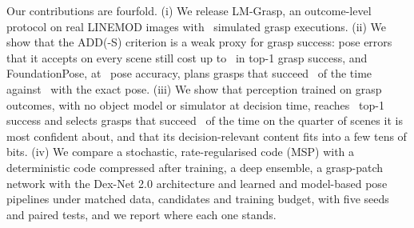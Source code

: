 Our contributions are fourfold. (i) We release LM-Grasp, an outcome-level protocol on real LINEMOD images with \NRollouts\ simulated grasp executions. (ii) We show that the ADD(-S) criterion is a weak proxy for grasp success: pose errors that it accepts on every scene still cost up to \NoiseSatDrop\ in top-1 grasp success, and FoundationPose, at \FpAdd\ pose accuracy, plans grasps that succeed \FpPlanTop\ of the time against \GtPlanTop\ with the exact pose. (iii) We show that perception trained on grasp outcomes, with no object model or simulator at decision time, reaches \EnsTopMean\ top-1 success and selects grasps that succeed \EnsSelQMean\ of the time on the quarter of scenes it is most confident about, and that its decision-relevant content fits into a few tens of bits. (iv) We compare a stochastic, rate-regularised code (MSP) with a deterministic code compressed after training, a deep ensemble, a grasp-patch network with the Dex-Net 2.0 architecture and learned and model-based pose pipelines under matched data, candidates and training budget, with five seeds and paired tests, and we report where each one stands.
